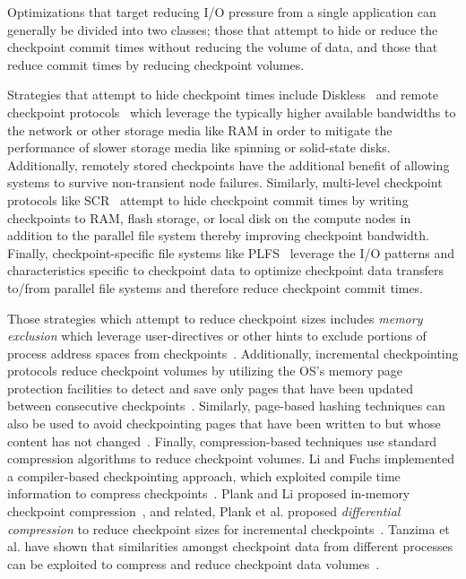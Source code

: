 Optimizations that target reducing I/O pressure from a single application can
generally be divided into two classes; those that attempt to hide or reduce the
checkpoint commit times without reducing the volume of data, and those that
reduce commit times by reducing checkpoint volumes. 

Strategies that attempt to hide checkpoint times include
Diskless~\cite{Plank98Diskless} and remote checkpoint
protocols~\cite{Cornwell11RemoteBLCR,Stellner96CoCheck,Zandy99ProcessHijacking}
which leverage the typically higher available bandwidths to the network or
other storage media like RAM in order to mitigate the performance of slower
storage media like spinning or solid-state disks. Additionally, remotely stored
checkpoints have the additional benefit of allowing systems to survive
non-transient node failures. Similarly, multi-level checkpoint protocols like
SCR~\cite{Moody10SCR,Vaidya95TwoLevel} attempt to hide checkpoint commit times
by writing checkpoints to RAM, flash storage, or local disk on the compute
nodes in addition to the parallel file system thereby improving checkpoint
bandwidth.  Finally, checkpoint-specific file systems like
PLFS~\cite{Bent09PLFS} leverage the I/O patterns and characteristics specific
to checkpoint data to optimize checkpoint data transfers to/from parallel file
systems and therefore reduce checkpoint commit times.

Those strategies which attempt to reduce checkpoint sizes includes \emph{memory
exclusion} which leverage user-directives or other hints to exclude portions of
process address spaces from checkpoints~\cite{Plank99MemoryExclusion}.
Additionally, incremental checkpointing protocols reduce checkpoint volumes by
utilizing the OS's memory page protection facilities to detect and save only
pages that have been updated between consecutive
checkpoints~\cite{Bronevetsky09Compiler,
Chen97CLIP,Elnozahy92ConsistentCheckpointing,Li94ConcurrentCheckpointing,
Plank94Libckpt,Paun10IncrementalWeibull,Kiswany08stdchk}.  Similarly, page-based
hashing techniques can also be used to avoid checkpointing pages that have been
written to but whose content has not changed~\cite{Ferreira11Libhashckpt}.
Finally, compression-based techniques use standard compression algorithms to
reduce checkpoint volumes.  Li and Fuchs implemented a compiler-based
checkpointing approach, which exploited compile time information to compress
checkpoints~\cite{Li90CATCH}.  Plank and Li proposed in-memory checkpoint
compression~\cite{Plank94ICKP}, and related, Plank et al. proposed
\textit{differential compression} to reduce checkpoint sizes for incremental
checkpoints~\cite{Plank95CompressedDiff}.  Tanzima et al. have shown that
similarities amongst checkpoint data from different processes can be exploited
to compress and reduce checkpoint data volumes~\cite{tanzima12mcrengine}.


